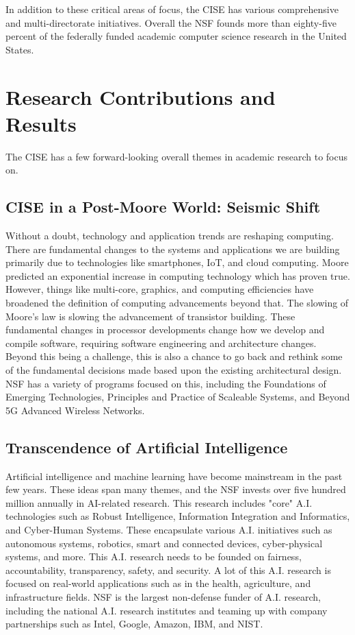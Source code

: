 \documentclass[journal,onecolumn]{IEEEtran}
\begin{document}
In addition to these critical areas of focus, the CISE has various comprehensive and multi-directorate initiatives. Overall the NSF founds more than eighty-five percent of the federally funded academic computer science research in the United States.

\section{Research Contributions and Results}

The CISE has a few forward-looking overall themes in academic research to focus on. 

\subsection{CISE in a Post-Moore World: Seismic Shift}

Without a doubt, technology and application trends are reshaping computing. There are fundamental changes to the systems and applications we are building primarily due to technologies like smartphones, IoT, and cloud computing. Moore predicted an exponential increase in computing technology which has proven true. However, things like multi-core, graphics, and computing efficiencies have broadened the definition of computing advancements beyond that. The slowing of Moore's law is slowing the advancement of transistor building. These fundamental changes in processor developments change how we develop and compile software, requiring software engineering and architecture changes. Beyond this being a challenge, this is also a chance to go back and rethink some of the fundamental decisions made based upon the existing architectural design. NSF has a variety of programs focused on this, including the Foundations of Emerging Technologies, Principles and Practice of Scaleable Systems, and Beyond 5G Advanced Wireless Networks. 

\subsection{Transcendence of Artificial Intelligence}

Artificial intelligence and machine learning have become mainstream in the past few years. These ideas span many themes, and the NSF invests over five hundred million annually in AI-related research. This research includes "core" A.I. technologies such as Robust Intelligence, Information Integration and Informatics, and Cyber-Human Systems. These encapsulate various A.I. initiatives such as autonomous systems, robotics, smart and connected devices, cyber-physical systems, and more. This A.I. research needs to be founded on fairness, accountability, transparency, safety, and security. A lot of this A.I. research is focused on real-world applications such as in the health, agriculture, and infrastructure fields. NSF is the largest non-defense funder of A.I. research, including the national A.I. research institutes and teaming up with company partnerships such as Intel, Google, Amazon, IBM, and NIST. 
\end{document}
